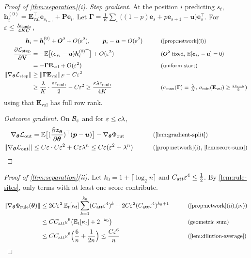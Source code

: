 \begin{proof}[Proof of \cref{thm:separation}(i)]
\emph{Step gradient.} At the position $i$ predicting $s_t$, $\bm h^{(0)}_i=\mathbf E_{\mathrm{val}}^\top\bm e_{s_{t-1}}+\mathbf P\bm e_i$. Let
$\bm\Gamma=\frac{1}{K}\sum_{s}\bigl((1-p)\bm e_s+p\bm e_{s+1}-\bm u\bigr)\bm e_s^\top$. For $\varepsilon\le\frac{\lambda c_{\mathrm{emb}}}{4KC}$,
\begin{alignat*}{2}
 \bm h_i&=\bm h^{(0)}_i+\bm O^2+O(\initscale^2),\qquad \bm p_i-\bm u=O(\initscale^2) &\qquad& \why{\cref{prop:network}(i)}\\
 \pd{\Lstep}{\mathbf V}&=-\E\bigl[(\bm e_{s_t}-\bm u)\bm h^{(0)\top}_i\bigr]+O(\initscale^2) && \why{$\bm O^2$ fixed, $\E[\bm e_{s_t}-\bm u]=0$}\\
 &=-\bm\Gamma\mathbf E_{\mathrm{val}}+O(\initscale^2) && \why{uniform start}\\
 \|\nabla_{\bm\theta}\Lstep\|&\ge\|\bm\Gamma\mathbf E_{\mathrm{val}}\|_F-C\initscale^2 && \\
 &\ge\frac{\mixrate}{K}\cdot\frac{\initscale\embconst}{2}-C\initscale^2\ge\frac{\initscale\mixrate\embconst}{4K} && \why{$\sigma_{\max}(\bm\Gamma)=\tfrac{\mixrate}{K}$, $\sigma_{\min}(\mathbf E_{\mathrm{val}})\ge\tfrac{\initscale\embconst}{2}$}
\end{alignat*}
using that $\mathbf E_{\mathrm{val}}$ has full row rank.

\emph{Outcome gradient.} On $\mathcal B_{\varepsilon}$ and for $\varepsilon\le c\lambda$,
\begin{alignat}{2}
 \nabla_{\bm\theta}\Lout&=\E\bigl[(\Jz)^\top(\bm p-\bm u)\bigr]-\nabla_{\bm\theta}\outcredit &\qquad& \why{\cref{lem:gradient-split}}\nonumber\\
 \|\nabla_{\bm\theta}\Lout\|&\le C\initscale\cdot C\initscale^2+C\initscale\mixrate^n\le C\initscale(\initscale^2+\mixrate^n) && \why{\cref{prop:network}(i), \cref{lem:score-sum}}\label{eq:outcome-grad}
\end{alignat}
\end{proof}

\begin{proof}[Proof of \cref{thm:separation}(ii)]
Let $k_0=1+\lceil\log_2n\rceil$ and $C_{\mathrm{att}}\varepsilon^4\le\frac{1}{2}$. By \cref{lem:rule-sites}, only terms with at least one score contribute.
\begin{alignat*}{2}
 \|\nabla_{\bm\theta}\rulecredit(\bm\theta)\|
 &\le2C\initscale^2\,\E_t[\kappa_t]\sum_{k=1}^{k_0}(\attconst\initscale^4)^k+2C\initscale^2(\attconst\initscale^4)^{k_0+1} &\qquad& \why{\cref{prop:network}(ii),(iv)}\\
 &\le C\attconst\initscale^6\bigl(\E_t[\kappa_t]+2^{-k_0}\bigr) && \why{geometric sum}\\
 &\le C\attconst\initscale^6\Bigl(\frac{6}{n}+\frac{1}{2n}\Bigr)\le\frac{C\initscale^6}{n} && \why{\cref{lem:dilution-average}}
\end{alignat*}
\end{proof}


